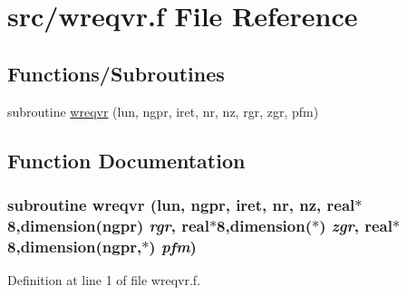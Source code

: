 \hypertarget{wreqvr_8f}{
\section{src/wreqvr.f File Reference}
\label{wreqvr_8f}
}
\subsection*{Functions/Subroutines}
\begin{CompactItemize}
\item 
subroutine \hyperlink{wreqvr_8f_d575c6e670cf2db5c2dca653a97ef0d2}{wreqvr} (lun, ngpr, iret, nr, nz, rgr, zgr, pfm)
\end{CompactItemize}


\subsection{Function Documentation}
\hypertarget{wreqvr_8f_d575c6e670cf2db5c2dca653a97ef0d2}{
\subsubsection[wreqvr]{\setlength{\rightskip}{0pt plus 5cm}subroutine wreqvr (lun, \/  ngpr, \/  iret, \/  nr, \/  nz, \/  real$\ast$8,dimension(ngpr) {\em rgr}, \/  real$\ast$8,dimension($\ast$) {\em zgr}, \/  real$\ast$8,dimension(ngpr,$\ast$) {\em pfm})}}
\label{wreqvr_8f_d575c6e670cf2db5c2dca653a97ef0d2}




Definition at line 1 of file wreqvr.f.